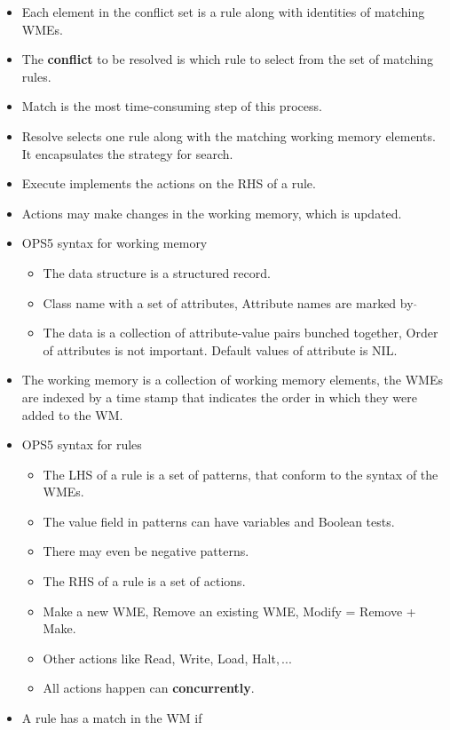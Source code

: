 \documentclass[a4paper]{article}
\begin{document}
\begin{itemize}
    \item Each element in the conflict set is a rule along with identities of matching WMEs.
    \item The \textbf{conflict} to be resolved is which rule to select from the set of matching rules.
    \item Match is the most time-consuming step of this process.
    \item Resolve selects one rule along with the matching working memory elements. It encapsulates the strategy for search.
    \item Execute implements the actions on the RHS of a rule.
    \item Actions may make changes in the working memory, which is updated.
    \item OPS5 syntax for working memory
    \begin{itemize}
        \item The data structure is a structured record.
        \item Class name with a set of attributes, Attribute names are marked by $\hat{}$
        \item The data is a collection of attribute-value pairs bunched together, Order of attributes is not important. Default values of attribute is NIL.
    \end{itemize}
    \item The working memory is a collection of working memory elements, the WMEs are indexed by a time stamp that indicates the order in which they were added to the WM.
    \item OPS5 syntax for rules
    \begin{itemize}
        \item The LHS of a rule is a set of patterns, that conform to the syntax of the WMEs.
        \item The value field in patterns can have variables and Boolean tests.
        \item There may even be negative patterns.
        \item The RHS of a rule is a set of actions.
        \item Make a new WME, Remove an existing WME, Modify = Remove + Make.
        \item Other actions like Read, Write, Load, Halt$,...$
        \item All actions happen can \textbf{concurrently}.
    \end{itemize}
    \item A rule has a match in the WM if

\end{itemize}
\end{document}
